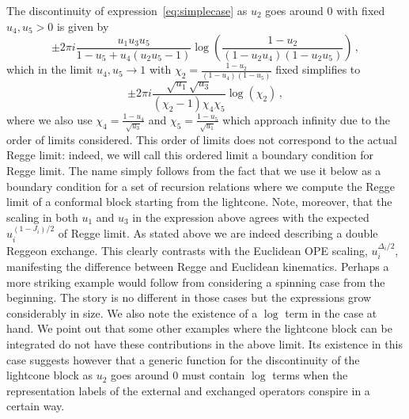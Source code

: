 The discontinuity of expression~\eqref{eq:simplecase} as $u_2$ goes around 0 with fixed $u_4, u_5 >0$ is given by
\begin{equation}
  \pm 2\pi i\frac{u_1 u_3 u_5}{1-u_5+u_4(u_2 u_5-1)}\log\left(\frac{1-u_2}{(1-u_2 u_4)(1-u_2 u_5)}\right)\,,
\end{equation}
which in the limit $u_4, u_5 \to 1$ with $\chi_2=\frac{1-u_2}{(1-u_4)(1-u_5)}$ fixed simplifies to
\begin{equation}
  \label{eq:discu2simple}
  \pm 2 \pi i\frac{\sqrt{u_1} \sqrt{u_3}}{\left(\chi_2-1\right) \chi_4\chi_5}\log \left(\chi_2\right)\,,
\end{equation}
where we also use $\chi_4=\frac{1-u_4}{\sqrt{u_3}}$ and $\chi_5=\frac{1-u_5}{\sqrt{u_1}}$ which approach infinity due to the order of limits considered. This order of limits does not correspond to the actual Regge limit: indeed, we will call this ordered limit a boundary condition for Regge limit. The name simply follows from the fact that we use it below as a boundary condition for a set of recursion relations where we compute the Regge limit of a conformal block starting from the lightcone. Note, moreover, that the scaling in both $u_1$ and $u_3$ in the expression above agrees with the expected $u_i^{(1-J_i)/2}$ of Regge limit. As stated above we are indeed describing a double Reggeon exchange. This clearly contrasts with the Euclidean OPE scaling, $u_i^{\Delta_i/2}$, manifesting the difference between Regge and Euclidean kinematics. Perhaps a more striking example would follow from considering a spinning case from the beginning. The story is no different in those cases but the expressions grow considerably in size.
We also note the existence of a $\log$ term in the case at hand. We point out that some other examples where the lightcone block can be integrated do not have these contributions in the above limit. Its existence in this case suggests however that a generic function for the discontinuity of the lightcone block as $u_2$ goes around 0 must contain $\log$ terms when the representation labels of the external and exchanged operators conspire in a certain way.

